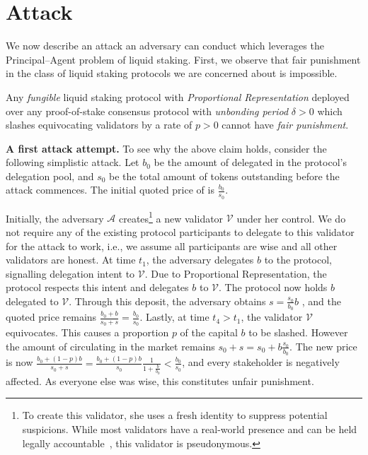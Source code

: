 \section{Attack}

We now describe an attack an adversary can conduct which leverages the
Principal--Agent problem of liquid staking. First, we observe that
fair punishment in the class of liquid staking protocols we are concerned
about is impossible.

\begin{claim}
Any \emph{fungible} liquid staking protocol with \emph{Proportional Representation}
deployed over any proof-of-stake consensus protocol with \emph{unbonding period}
$\delta > 0$ which slashes equivocating validators by a rate of $p > 0$
cannot have \emph{fair punishment}.
\end{claim}

\noindent
\textbf{A first attack attempt.}
To see why the above claim holds, consider the following simplistic attack.
Let $b_0$ be the amount of delegated \asset in the protocol's delegation pool,
and $s_0$ be the total amount of \stasset tokens outstanding
before the attack commences. The initial quoted price of \stasset
is $\frac{b_0}{s_0}$.

Initially,
the adversary $\mathcal{A}$ creates\footnote{To create this validator, she uses a fresh identity
to suppress potential suspicions. While most validators
have a real-world presence and can be held legally
accountable~\cite{liquid-staking-report}, this validator is pseudonymous.}
a new validator $\mathcal{V}$ under her control.
We do not require any of the existing protocol participants to delegate
to this validator for the attack to work, i.e., we assume all participants
are wise and all other validators are honest.
At time $t_1$, the adversary delegates $b$ \asset to the protocol,
signalling delegation intent to $\mathcal{V}$.
Due to Proportional Representation,
the protocol respects this intent and delegates $b$ to $\mathcal{V}$.
The protocol now holds $b$ delegated \asset to $\mathcal{V}$.
Through this deposit, the adversary obtains
$s = \frac{s_0}{b_0} b$ \stasset, and the quoted price remains
$\frac{b_0 + b}{s_0 + s} = \frac{b_0}{s_0}$.
Lastly, at time $t_4 > t_1$, the validator
$\mathcal{V}$ equivocates. This causes a proportion $p$ of
the capital $b$ to be slashed.
However the amount of \stasset circulating in the
market remains $s_0 + s = s_0 + b\frac{s_0}{b_0}$.
The new price is now
$\frac{b_0 + (1 - p)b}{s_0 + s} = \frac{b_0 + (1 - p)b}{s_0}\frac{1}{1 + \frac{b}{b_0}} < \frac{b_0}{s_0}$,
and every stakeholder is negatively affected. As everyone else was
wise, this constitutes unfair punishment.

